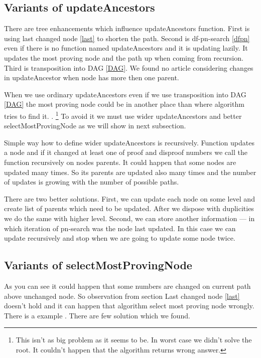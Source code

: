 \subsection{Variants of updateAncestors}

There are tree enhancements which influence updateAncestors function. First is
using last changed node \ref{last} to shorten the path. Second is df-pn-search
\ref{dfpn} even if there is no function named updateAncestors and it is
updating lazily. It updates the most proving node and the path up when coming
from recursion. Third is transposition into DAG \ref{DAG}. We found no article
considering changes in updateAncestor when node has more then one parent.

When we use ordinary updateAncestors even if we use transposition into DAG
\ref{DAG} the most proving node could be in another place than where algorithm
tries to find it. . \footnote{This isn't as big
problem as it seems to be. In worst case we didn't solve the root. It couldn't
happen that the algorithm returns wrong answer. } To avoid it we must use wider updateAncestors and better
selectMostProvingNode as we will show in next subsection. 

Simple way how to define wider updateAncestors is recursively. Function updates
a node and if it changed at least one of proof and disproof numbers we call the
function recursively on nodes parents. It could happen that some nodes are
updated many times. So its parents are updated also many times and the number
of updates is growing with the number of possible paths. 

There are two better solutions. First, we can update each node on some level
and create list of parents which need to be updated. After we dispose with
duplicities we do the same with higher level. Second, we can store another
information --- in which iteration of pn-search was the node last updated. In
this case we can update recursively and stop when we are going to update some
node twice. 


\subsection{Variants of selectMostProvingNode}

As you can see  it could happen that some numbers are changed on
current path above unchanged node. So observation from section Last changed
node \ref{last} doesn't hold and it can happen that algorithm select most
proving node wrongly. There is a example . There are few solution which
we found.

